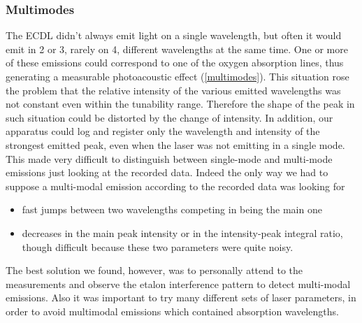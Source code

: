 \subsubsection{Multimodes}
The ECDL didn't always emit light on a single wavelength, but often it would emit in 2 or 3, rarely on 4, different wavelengths at the same time. One or more of these emissions could correspond to one of the oxygen absorption lines, thus generating a measurable photoacoustic effect (\cref{multimodes}). This situation rose the problem that the relative intensity of the various emitted wavelengths was not constant even within the tunability range. Therefore the shape of the peak in such situation could be distorted by the change of intensity. In addition, our apparatus could log and register only the wavelength and intensity of the strongest emitted peak, even when the laser was not emitting in a single mode. This made very difficult to distinguish between single-mode and multi-mode emissions just looking at the recorded data. 
Indeed the only way we had to suppose a multi-modal emission according to the recorded data was looking for
\begin{itemize}
\item fast jumps between two wavelengths competing in being the main one
\item decreases in the main peak intensity or in the intensity-peak integral ratio, though difficult because these two parameters were quite noisy.
\end{itemize}
The best solution we found, however, was to personally attend to the measurements and observe the etalon interference pattern to detect multi-modal emissions. Also it was important to try many different sets of laser parameters, in order to avoid multimodal emissions which contained absorption wavelengths.

